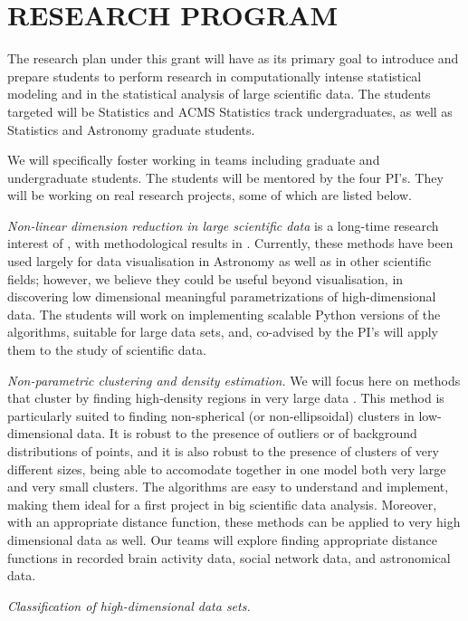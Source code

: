 \section{RESEARCH PROGRAM}
\label{sec:research}

The research plan under this grant will have as its primary goal to
introduce and prepare students to perform research in computationally
intense statistical modeling and in the statistical analysis of large
scientific data. The students targeted will be Statistics and ACMS
Statistics track undergraduates, as well as Statistics and Astronomy
graduate students. 

We will specifically foster working in teams including graduate and
undergraduate students. The students will be mentored by the four
PI's. They will be working on real research projects, some of which
are listed below. 
\bits
\item {\em Non-linear dimension reduction in large scientific data} is a long-time research interest of \meila, with methodological results in \cite{PerraultM:asymptotic-nips11,Perrault-JoncasM:riemann-jmlr11}. Currently, these methods have been used largely for data visualisation in Astronomy as well as in other scientific fields; however, we believe they could be useful beyond visualisation, in discovering low dimensional meaningful parametrizations of high-dimensional data. The students will work on implementing scalable Python versions of the algorithms, suitable for large data sets, and, co-advised by the PI's will apply them to the study of scientific data.
\item {\em Non-parametric clustering and density estimation.} We will
  focus here on methods that cluster by finding high-density regions
  in very large data \cite{cheng:95,nugent:10,rinaldo:13}. This method
  is particularly suited to finding non-spherical (or non-ellipsoidal)
  clusters in low-dimensional data. It is robust to the presence of
  outliers or of background distributions of points, and it is also
  robust to the presence of clusters of very different sizes, being
  able to accomodate together in one model both very large and very
  small clusters. The algorithms are easy to understand and implement,
  making them ideal for a first project in big scientific data
  analysis. Moreover, with an appropriate distance function, these
  methods can be applied to very high dimensional data as well. Our
  teams will explore finding appropriate distance functions in
  recorded brain activity data, social network data, and astronomical
  data.
\item {\em Classification of high-dimensional data sets.} 
